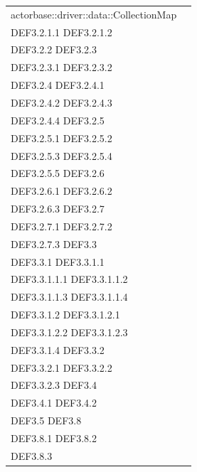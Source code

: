 \documentclass{scalatekids-article}
\begin{document}
\begin{longtable}[H]{|p{12cm}|p{5.5cm}|}
actorbase::driver::data::CollectionMap & \multiLineCell[t]{DEF3.2 DEF3.2.1\\DEF3.2.1.1 DEF3.2.1.2\\DEF3.2.2 DEF3.2.3\\DEF3.2.3.1 DEF3.2.3.2\\DEF3.2.4 DEF3.2.4.1\\DEF3.2.4.2 DEF3.2.4.3\\DEF3.2.4.4 DEF3.2.5\\DEF3.2.5.1 DEF3.2.5.2\\DEF3.2.5.3 DEF3.2.5.4\\DEF3.2.5.5 DEF3.2.6\\DEF3.2.6.1 DEF3.2.6.2\\DEF3.2.6.3 DEF3.2.7\\DEF3.2.7.1 DEF3.2.7.2\\DEF3.2.7.3 DEF3.3\\DEF3.3.1 DEF3.3.1.1\\DEF3.3.1.1.1 DEF3.3.1.1.2\\DEF3.3.1.1.3 DEF3.3.1.1.4\\DEF3.3.1.2 DEF3.3.1.2.1\\DEF3.3.1.2.2 DEF3.3.1.2.3\\DEF3.3.1.4 DEF3.3.2\\DEF3.3.2.1 DEF3.3.2.2\\DEF3.3.2.3 DEF3.4\\DEF3.4.1 DEF3.4.2\\DEF3.5 DEF3.8\\DEF3.8.1 DEF3.8.2\\DEF3.8.3}\\
\hline
\end{longtable}
\end{document}
